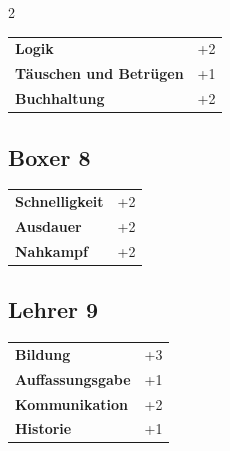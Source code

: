 \begin{multicols}{2}
\begin{tcolorbox}
\begin{tabular}{@{}ll@{}}
    \textbf{Logik} & +2\\
    \textbf{Täuschen und Betrügen} & +1\\
    \textbf{Buchhaltung} & +2\\
\end{tabular}


\end{tcolorbox}

\begin{tcolorbox}
    \subsection*{Boxer \hfill \small{8 }}
    \tcblower




\begin{tabular}{@{}ll@{}}
    \textbf{Schnelligkeit} & +2\\
    \textbf{Ausdauer} & +2\\
    \textbf{Nahkampf} & +2\\
\end{tabular}


\end{tcolorbox}

\begin{tcolorbox}
    \subsection*{Lehrer \hfill \small{9 }}
    \tcblower




\begin{tabular}{@{}ll@{}}
    \textbf{Bildung} & +3\\
    \textbf{Auffassungsgabe} & +1\\
    \textbf{Kommunikation} & +2\\
    \textbf{Historie} & +1\\
\end{tabular}


\end{tcolorbox}
\end{multicols}
